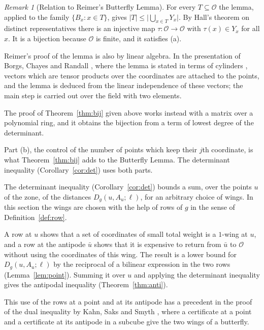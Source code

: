 \documentclass[11pt,reqno]{amsart}
\makeatletter
\theoremstyle{definition}
\theoremstyle{remark}
\newtheorem{remark}[theorem]{Remark}
\numberwithin{equation}{section}
\theoremstyle{named}
\theoremstyle{plain}
\renewcommand{\section}{\@startsection{section}{1}%
  \z@{1.3\linespacing\@plus.7\linespacing}{.65\linespacing}{\normalfont\scshape\centering}}
\newcommand{\cO}{\mathcal{O}}
\newcommand{\abs}[1]{\lvert #1\rvert}
\makeatother
\begin{document}
\begin{remark}[Relation to Reimer's Butterfly Lemma]
For every $T\subseteq\cO$ the lemma, applied to the family $\{B_x:x\in T\}$,
gives $\abs{T}\le\bigl\lvert\bigcup_{x\in T}Y_x\bigr\rvert$. By Hall's theorem on distinct
representatives \cite{Hall} there is an injective map $\tau\colon\cO\to\cO$ with $\tau(x)\in Y_x$
for all $x$. It is a bijection because $\cO$ is finite, and it satisfies (a).

Reimer's proof of the lemma \cite[Section~2]{Rei} is also by linear algebra. In the presentation of Borgs, Chayes and
Randall \cite[Section~5]{BCR}, where the lemma is stated in terms of cylinders
\cite[Lemma~4.1]{BCR}, vectors which are tensor products over the coordinates are attached
to the points, and the lemma is deduced from the linear independence of these vectors; the main
step is carried out over the field with two elements.

The proof of Theorem~\ref{thm:bij} given
above works instead with a matrix over a polynomial ring, and it obtains the bijection from a term
of lowest degree of the determinant.

Part (b), the control of the number of points which keep their $j$th coordinate, is what
Theorem~\ref{thm:bij} adds to the Butterfly Lemma. The determinant inequality (Corollary~\ref{cor:det}) uses both parts.
\end{remark}

\section{The antipodal inequality}\label{sec:anti}

The determinant inequality (Corollary~\ref{cor:det}) bounds a sum, over the points $u$ of the zone, of the distances
$D_g(u,A_u;\ell)$, for an arbitrary choice of wings. In this section the wings are chosen with the
help of rows of $g$ in the sense of Definition~\ref{def:row}.

A row at $u$ shows that a set of
coordinates of small total weight is a $1$-wing at
$u$, and a row at the antipode $\bar u$ shows that it is expensive to return from $\bar u$ to $\cO$
without using the coordinates of this wing. The result is a lower bound for $D_g(u,A_u;\ell)$ by
the reciprocal of a bilinear expression in the two rows (Lemma~\ref{lem:point}). Summing it over $u$
and applying the determinant inequality gives the antipodal inequality (Theorem~\ref{thm:anti}).

This use of the rows at a point and at its antipode has a precedent in the proof of the dual
inequality by Kahn, Saks and Smyth \cite[Section~2]{KSS}, where a certificate at a point and a
certificate at its antipode in a subcube give the two wings of a butterfly.
\end{document}
